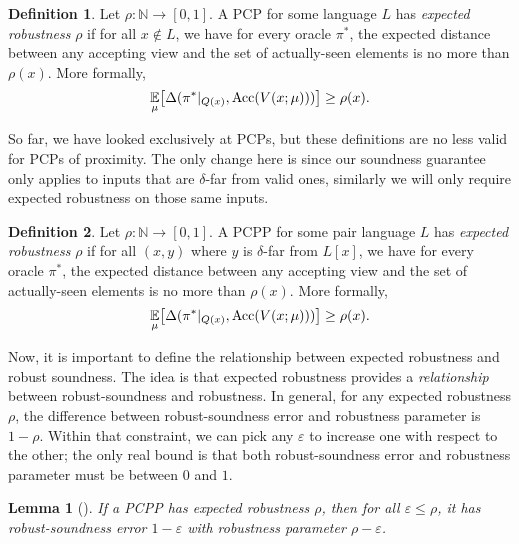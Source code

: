 \documentclass[english,12pt]{reedthesis}
\theoremstyle{plain}
\newtheorem{lemma}[lemma]{Lemma}
\theoremstyle{definition}
\newtheorem{defn}[defn]{Definition}
\theoremstyle{remark}
\DeclareMathOperator{\Acc}{Acc}
\begin{document}
\begin{defn}\label{def:exp-rob-pcp}
  Let $\rho: \mathbb{N} \rightarrow [0,1]$. A PCP for some language $L$ has \emph{expected
    robustness} $\rho$ if for all $x \notin L$, we have for every oracle $\pi^{*}$, the
  expected distance between any accepting view and the set of actually-seen
  elements is no more than $\rho(x)$. More formally,
  \begin{equation}
    \underset{\mu}{\mathbb{E}}\mleft[\Delta(\pi^{*}|_{Q(x)}, \Acc(V(x; \mu)))\mright] \ge \rho(x).
  \end{equation}
\end{defn}

So far, we have looked exclusively at PCPs, but these definitions are no less
valid for PCPs of proximity. The only change here is since our soundness
guarantee only applies to inputs that are $\delta$-far from valid ones, similarly we
will only require expected robustness on those same inputs.

\begin{defn}\label{def:exp-rob-pcpp}
  Let $\rho: \mathbb{N} \rightarrow [0,1]$. A PCPP for some pair language $L$ has \emph{expected
    robustness} $\rho$ if for all $(x, y)$ where $y$ is $\delta$-far from $L[x]$, we
  have for every oracle $\pi^{*}$, the expected distance between any accepting
  view and the set of actually-seen elements is no more than $\rho(x)$. More
  formally,
  \begin{equation}
    \underset{\mu}{\mathbb{E}}\mleft[\Delta(\pi^{*}|_{Q(x)}, \Acc(V(x; \mu)))\mright] \ge \rho(x).
  \end{equation}
\end{defn}

Now, it is important to define the relationship between expected robustness and
robust soundness. The idea is that expected robustness provides a
\emph{relationship} between robust-soundness and robustness. In general, for any
expected robustness $\rho$, the difference between robust-soundness error and
robustness parameter is $1 - \rho$. Within that constraint, we can pick any $\varepsilon$ to
increase one with respect to the other; the only real bound is that both
robust-soundness error and robustness parameter must be between $0$ and $1$.

\begin{lemma}[{\cite[Proposition 2.10]{BGHSV06}}]\label{lem:exp-rob-to-rs}
  If a PCPP has expected robustness $\rho$, then for all $\varepsilon \le \rho$, it has
  robust-soundness error $1 - \varepsilon$ with robustness parameter $\rho - \varepsilon$.
\end{lemma}
\end{document}

